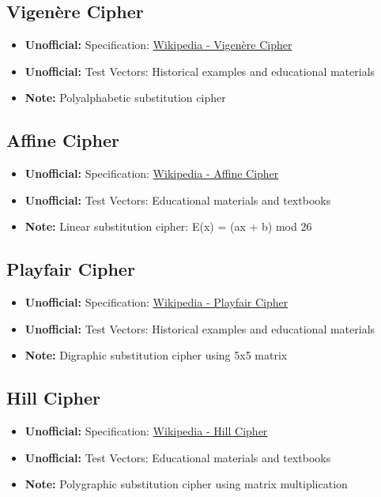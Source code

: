 \documentclass[12pt,a4paper]{article}
\newcommand{\unofficial}[1]{\textcolor{warningred}{\textbf{Unofficial:}} #1}
\newcommand{\note}[1]{\textcolor{noteorange}{\textbf{Note:}} #1}
\newcommand{\link}[2]{\href{#1}{#2}}
\begin{document}
\subsection{Vigenère Cipher}
\begin{itemize}
    \item \unofficial{Specification:} \link{https://en.wikipedia.org/wiki/Vigenère_cipher}{Wikipedia - Vigenère Cipher}
    \item \unofficial{Test Vectors:} Historical examples and educational materials
    \item \note{Polyalphabetic substitution cipher}
\end{itemize}

\subsection{Affine Cipher}
\begin{itemize}
    \item \unofficial{Specification:} \link{https://en.wikipedia.org/wiki/Affine_cipher}{Wikipedia - Affine Cipher}
    \item \unofficial{Test Vectors:} Educational materials and textbooks
    \item \note{Linear substitution cipher: E(x) = (ax + b) mod 26}
\end{itemize}

\subsection{Playfair Cipher}
\begin{itemize}
    \item \unofficial{Specification:} \link{https://en.wikipedia.org/wiki/Playfair_cipher}{Wikipedia - Playfair Cipher}
    \item \unofficial{Test Vectors:} Historical examples and educational materials
    \item \note{Digraphic substitution cipher using 5x5 matrix}
\end{itemize}

\subsection{Hill Cipher}
\begin{itemize}
    \item \unofficial{Specification:} \link{https://en.wikipedia.org/wiki/Hill_cipher}{Wikipedia - Hill Cipher}
    \item \unofficial{Test Vectors:} Educational materials and textbooks
    \item \note{Polygraphic substitution cipher using matrix multiplication}
\end{itemize}
\end{document}
